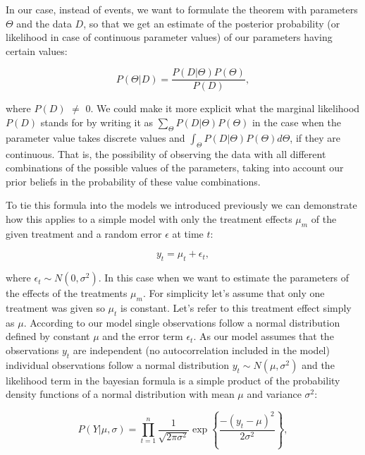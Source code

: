 \documentclass[12pt,a4paper,leqno]{report}
\theoremstyle{plain}
\theoremstyle{definition}
\theoremstyle{remark}
\begin{document}
In our case, instead of events, we want to formulate the theorem with parameters
\(\Theta \) and the data \(D\), so that we get an estimate of the posterior
probability (or likelihood in case of continuous parameter values) of our
parameters having certain values:

\begin{def}\label{}
    \begin{equation}\label{bayeswithparams}
        P(\Theta|D) = \frac{P(D|\Theta)P(\Theta)}{P(D)},
    \end{equation}
\end{def}where \(P(D)\) \(\neq \) 0. We could make it more explicit what the marginal likelihood \(P(D)\) stands for
by writing it as \(\sum_\Theta P(D|\Theta)P(\Theta)\) in the case when the parameter
value takes discrete values and \(\int_\Theta P(D|\Theta)P(\Theta) d\Theta \),
if they are continuous. That is, the possibility of observing the data with all
different combinations of the possible values of the parameters, taking into
account our prior beliefs in the probability of these value combinations.

To tie this formula into the models we introduced previously we can demonstrate
how this applies to a simple model with only the treatment effects \(\mu_m \) of
the given treatment and a random error \(\epsilon \) at time \(t\):

\begin{def}\label{}
    \begin{equation}\label{}
        y_t = \mu_t + \epsilon_t,
    \end{equation}
\end{def}where \(\epsilon_{t} \sim N(0,\sigma^2)\). In this case when we want to estimate the parameters of the effects of the
treatments \(\mu_m\). For simplicity let's assume that only one treatment was
given so \(\mu_t\) is constant. Let's refer to this treatment effect simply as
\(\mu \). According to our model single observations follow a normal
distribution defined by constant \(\mu \) and the error term \(\epsilon_t \). As
our model assumes that the observations \(y_t\) are independent (no
autocorrelation included in the model) individual observations follow a normal
distribution \(y_t \sim N(\mu,\sigma^2) \) and the likelihood term in the bayesian formula is
a simple product of the probability density functions of a normal distribution
with mean \(\mu \) and variance \(\sigma^2 \):

\begin{def}\label{}
    \begin{equation}\label{}
        P(Y|\mu, \sigma)
        =
        \prod_{t=1}^{n}
        \frac{1}
        {{\sqrt {2\pi \sigma^2} }}
        \exp{ \left \{ \frac{-(y_t-\mu)^2} {2\sigma^2} \right \} },
    \end{equation}
\end{def}
\end{document}
